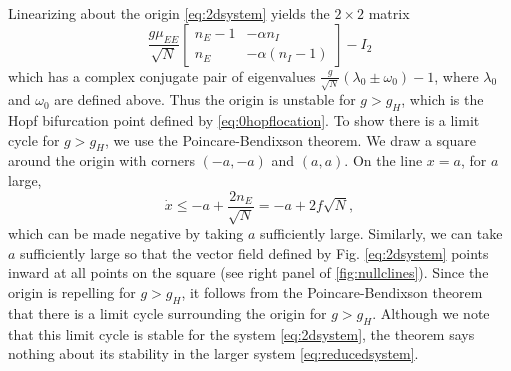 \documentclass[11pt,reqno]{amsart}
\begin{document}
Linearizing about the origin \cref{eq:2dsystem} yields the $2 \times 2$ matrix
\[
\frac{g \mu_{EE}}{\sqrt{N}}
\begin{bmatrix} 
n_E - 1 & -\alpha n_I \\
n_E & -\alpha(n_I - 1)
\end{bmatrix} - I_2
\]
which has a complex conjugate pair of eigenvalues $\frac{g}{\sqrt{N}}(\lambda_0 \pm \omega_0) - 1$, where $\lambda_0$ and $\omega_0$ are defined above. Thus the origin is unstable for $g > g_H$, which is the Hopf bifurcation point defined by \cref{eq:0hopflocation}. To show there is a limit cycle for $g > g_H$, we use the Poincare-Bendixson theorem. We draw a square around the origin with corners $(-a, -a)$ and $(a, a)$. On the line $x = a$, for $a$ large, 
\[
\dot{x} \leq -a + \frac{2 n_E}{\sqrt{N}} = -a + 2 f \sqrt{N},
\]
which can be made negative by taking $a$ sufficiently large. Similarly, we can take $a$ sufficiently large so that the vector field defined by Fig. \ref{eq:2dsystem} points inward at all points on the square (see right panel of \cref{fig:nullclines}). Since the origin is repelling for $g > g_H$, it follows from the Poincare-Bendixson theorem that there is a limit cycle surrounding the origin for $g > g_H$. Although we note that this limit cycle is stable for the system \cref{eq:2dsystem}, the theorem says nothing about its stability in the larger system \cref{eq:reducedsystem}.
\end{document}
